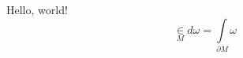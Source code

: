 \documentclass[a4paper, 12pt]{article}
\begin{document}
    Hello, world!
    $$
        \in\limits_{M} d\omega = \int\limits_{\partial M} \omega
    $$
\end{document}
